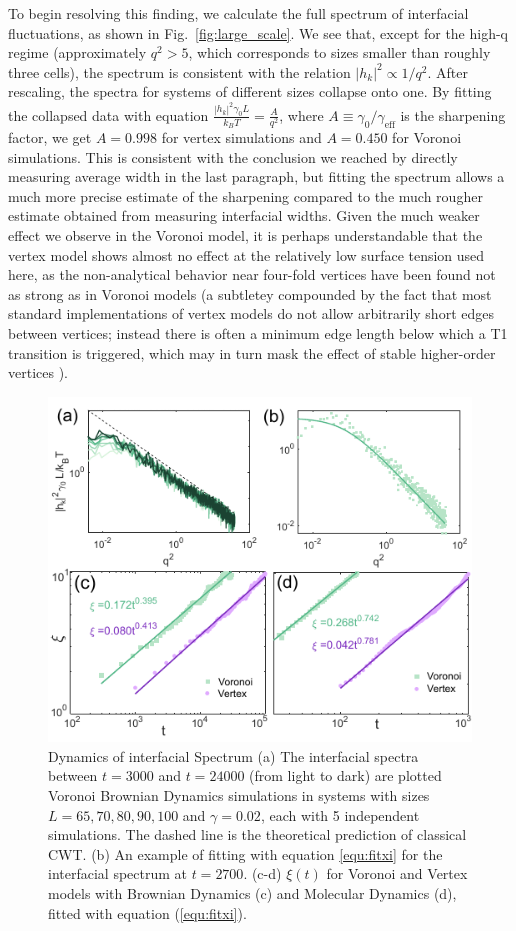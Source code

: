 \documentclass[twoside,twocolumn,9pt]{article}
\begin{document}
To begin resolving this finding, we calculate the full spectrum of interfacial fluctuations, as shown in Fig.~\ref{fig:large_scale}. We see that, except for the high-q regime (approximately $q^2>5$, which corresponds to sizes smaller than roughly three cells), the spectrum is consistent with the relation $|h_k|^2 \propto 1/q^2$. After rescaling, the spectra for systems of different sizes collapse onto one. By fitting the collapsed data with equation  $\frac{|h_k|^2\gamma_0 L}{k_B T} = \frac{A}{q^2}$, where $A\equiv \gamma_0/\gamma_{\text{eff}}$ is the sharpening factor, we get $A=0.998$ for vertex simulations and $A=0.450$ for Voronoi simulations. This is consistent with the conclusion we reached by directly measuring average width in the last paragraph, but fitting the spectrum allows a much more precise estimate of the sharpening compared to the much rougher estimate obtained from measuring interfacial widths. Given the much weaker effect we observe in the Voronoi model, it is perhaps understandable that the vertex model shows almost no effect at the relatively low surface tension used here, as the non-analytical behavior near four-fold vertices have been found not as strong as in Voronoi models \cite{lawson2024differences} (a subtletey compounded by the fact that most standard implementations of vertex models do not allow arbitrarily short edges between vertices; instead there is often a minimum edge length below which a T1 transition is triggered, which may in turn mask the effect of stable higher-order vertices \cite{yan2019multicellular}).

\begin{figure}[t]
    \centering
    \includegraphics[width=0.9\columnwidth]{Figure2.pdf}
    \caption{Dynamics of interfacial Spectrum (a) The interfacial spectra between $t=3000$ and $t=24000$ (from light to dark) are plotted Voronoi Brownian Dynamics simulations in systems with sizes $L=65, 70, 80, 90, 100$ and $\gamma=0.02$, each with 5 independent simulations. The dashed line is the theoretical prediction of classical CWT. (b) An example of fitting with equation \ref{equ:fitxi} for the interfacial spectrum at $t=2700$. (c-d) $\xi(t)$ for Voronoi and Vertex models with Brownian Dynamics (c) and Molecular Dynamics (d), fitted with equation (\ref{equ:fitxi}).}
    \label{fig:xi_time}
\end{figure}
\end{document}
